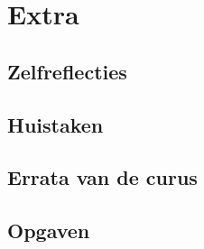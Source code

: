 \documentclass[a4paper,10pt,oneside]{book}
\begin{document}
\part{Extra}


\chapter{Zelfreflecties}







\chapter{Huistaken}



\appendix
\chapter{Errata van de curus}


\chapter{Opgaven}






\end{document}
